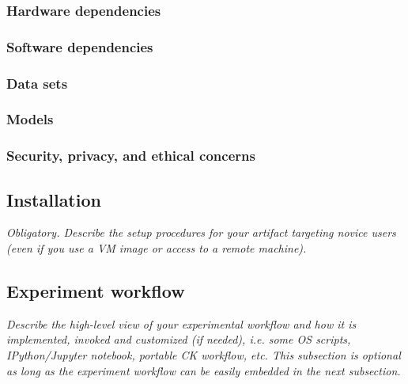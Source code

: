 \documentclass[letterpaper,twocolumn,10pt]{article}
\begin{document}
{\subsubsection{Hardware dependencies}

\subsubsection{Software dependencies}

\subsubsection{Data sets}

\subsubsection{Models}

\subsubsection{Security, privacy, and ethical concerns}

\subsection{Installation}

{\em Obligatory. Describe the setup procedures for your artifact targeting novice users (even if you use a VM image or access to a remote machine).}

\subsection{Experiment workflow}

{\em Describe the high-level view of your experimental workflow and how it is implemented, invoked and customized (if needed), i.e. some OS scripts, IPython/Jupyter notebook, portable CK workflow, etc. This subsection is optional as long as the experiment workflow can be easily embedded in the next subsection.
}

}
\end{document}
